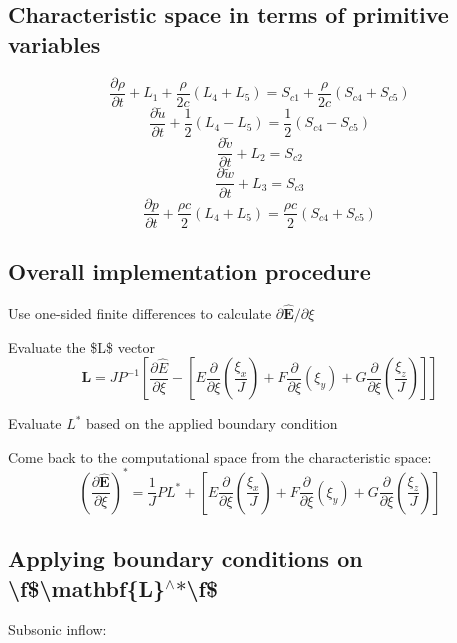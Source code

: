 \]\hypertarget{weno_charprim}{}\subsection{Characteristic space in terms of primitive variables}\label{weno_charprim}
\[ \begin{equation*} \frac{\partial \rho}{\partial t}+L_1+\frac{\rho}{2c}(L_4+L_5)=S_{c1}+\frac{\rho}{2c}(S_{c4}+S_{c5}) \end{equation*} \] \[ \begin{equation*} \frac{\partial \tilde{u}}{\partial t}+\frac{1}{2}(L_4-L_5)=\frac{1}{2}(S_{c4}-S_{c5}) \end{equation*} \] \[ \begin{equation*} \frac{\partial \tilde{v}}{\partial t}+L_2=S_{c2} \end{equation*} \] \[ \begin{equation*} \frac{\partial \tilde{w}}{\partial t}+L_3=S_{c3} \end{equation*} \] \[ \begin{equation*} \frac{\partial p}{\partial t}+\frac{\rho c}{2}(L_4+L_5)=\frac{\rho c}{2}(S_{c4}+S_{c5}) \end{equation*} \]\hypertarget{weno_ovimp}{}\subsection{Overall implementation procedure}\label{weno_ovimp}
Use one-\/sided finite differences to calculate $\partial \hat{\mathbf{E}}/\partial \xi$

Evaluate the \$L\$ vector \[ \begin{equation*} \mathbf{L}=J P^{-1}\left[\frac{\partial \hat{E}}{\partial \xi}-\left[E\frac{\partial}{\partial \xi}\left(\frac{\xi_x}{J}\right)+F \frac{\partial}{\partial \xi}\left( \xi_y\right)+G \frac{\partial}{\partial \xi}\left(\frac{\xi_z}{J}\right) \right]\right] \end{equation*} \]

Evaluate $L^*$ based on the applied boundary condition

Come back to the computational space from the characteristic space\+: \[ \begin{equation*} \left(\frac{\partial \hat{\mathbf{E}}}{\partial \xi} \right)^*=\frac{1}{J}P L^*+\left[E\frac{\partial}{\partial \xi}\left(\frac{\xi_x}{J}\right)+F \frac{\partial}{\partial \xi}\left( \xi_y\right)+G \frac{\partial}{\partial \xi}\left(\frac{\xi_z}{J}\right) \right] \end{equation*} \]\hypertarget{weno_bcbc}{}\subsection{Applying boundary conditions on \textbackslash{}f\$\textbackslash{}mathbf\{\+L\}$^\wedge$$\ast$\textbackslash{}f\$}\label{weno_bcbc}
Subsonic inflow\+:


